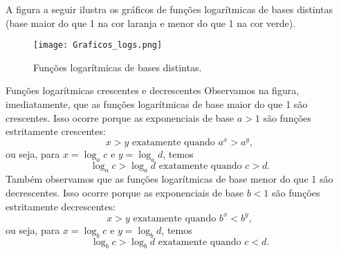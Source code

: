 A figura a seguir ilustra os gráficos de funções logarítmicas de bases distintas (base maior do que 1 na cor laranja e menor do que 1 na cor verde).

\begin{figure}[!htb]
\centering
\texttt{[image: Graficos\_logs.png]}
\caption{Funções logarítmicas de bases distintas.}
\end{figure}


\begin{observationtitle}{Funções logarítmicas crescentes e decrescentes}
Observamos na figura, imediatamente, que as funções logarítmicas de base maior do que 1 são crescentes. Isso ocorre porque as exponenciais de base $a>1$ são funções estritamente crescentes:
$$
x > y \mbox{ exatamente quando } a^x > a^y,
$$
ou seja, para $x=\log_a c$ e $y=\log_a d$, temos
$$
\log_a c > \log_a d \mbox{ exatamente quando } c > d.
$$
Também observamos que as funções logarítmicas de base menor do que 1 são decrescentes. Isso ocorre porque as exponenciais de base $b<1$ são funções estritamente decrescentes:
$$
x > y \mbox{ exatamente quando } b^x < b^y,
$$
ou seja, para $x=\log_b c$ e $y=\log_b d$, temos
$$
\log_b c > \log_b d \mbox{ exatamente quando } c < d.
$$

\end{observationtitle}

